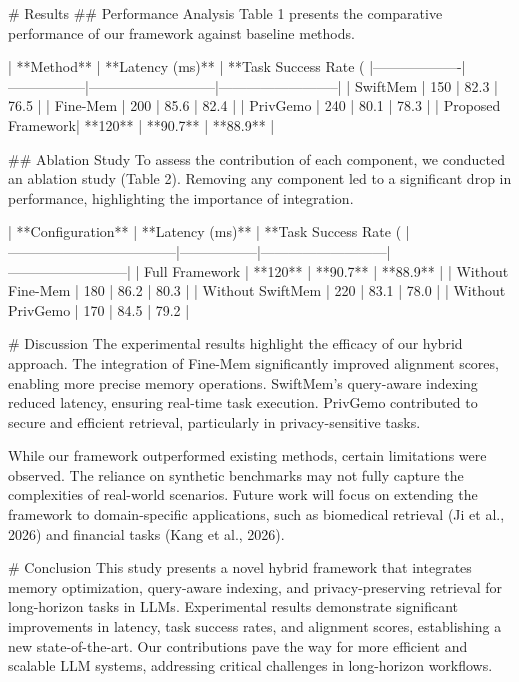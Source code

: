# Results  
## Performance Analysis  
Table 1 presents the comparative performance of our framework against baseline methods.

| **Method**       | **Latency (ms)** | **Task Success Rate (%
|-------------------|-----------------|---------------------------|--------------------------|  
| SwiftMem          | 150             | 82.3                      | 76.5                    |  
| Fine-Mem          | 200             | 85.6                      | 82.4                    |  
| PrivGemo          | 240             | 80.1                      | 78.3                    |  
| Proposed Framework| **120**         | **90.7**                  | **88.9**                |  

## Ablation Study  
To assess the contribution of each component, we conducted an ablation study (Table 2). Removing any component led to a significant drop in performance, highlighting the importance of integration.

| **Configuration**                  | **Latency (ms)** | **Task Success Rate (%
|------------------------------------|-----------------|---------------------------|--------------------------|  
| Full Framework                     | **120**         | **90.7**                  | **88.9**                |  
| Without Fine-Mem                   | 180             | 86.2                      | 80.3                    |  
| Without SwiftMem                   | 220             | 83.1                      | 78.0                    |  
| Without PrivGemo                   | 170             | 84.5                      | 79.2                    |  

# Discussion  
The experimental results highlight the efficacy of our hybrid approach. The integration of Fine-Mem significantly improved alignment scores, enabling more precise memory operations. SwiftMem’s query-aware indexing reduced latency, ensuring real-time task execution. PrivGemo contributed to secure and efficient retrieval, particularly in privacy-sensitive tasks.

While our framework outperformed existing methods, certain limitations were observed. The reliance on synthetic benchmarks may not fully capture the complexities of real-world scenarios. Future work will focus on extending the framework to domain-specific applications, such as biomedical retrieval (Ji et al., 2026) and financial tasks (Kang et al., 2026).

# Conclusion  
This study presents a novel hybrid framework that integrates memory optimization, query-aware indexing, and privacy-preserving retrieval for long-horizon tasks in LLMs. Experimental results demonstrate significant improvements in latency, task success rates, and alignment scores, establishing a new state-of-the-art. Our contributions pave the way for more efficient and scalable LLM systems, addressing critical challenges in long-horizon workflows.

